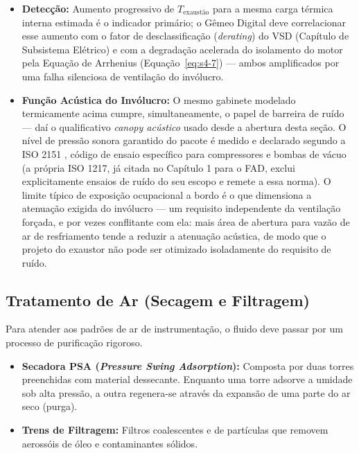 \documentclass[12pt,a4paper]{article}
\numberwithin{equation}{section}
\numberwithin{table}{section}
\numberwithin{figure}{section}
\begin{document}
\begin{itemize}
		\item \textbf{Detecção:} Aumento progressivo de $T_{\text{exaustão}}$ para a mesma carga térmica interna estimada é o indicador primário; o Gêmeo Digital deve correlacionar esse aumento com o fator de desclassificação (\textit{derating}) do VSD (Capítulo de Subsistema Elétrico) e com a degradação acelerada do isolamento do motor pela Equação de Arrhenius (Equação~\eqref{eq:s4-7}) — ambos amplificados por uma falha silenciosa de ventilação do invólucro.
		\item \textbf{Função Acústica do Invólucro:} O mesmo gabinete modelado termicamente acima cumpre, simultaneamente, o papel de barreira de ruído — daí o qualificativo \textit{canopy acústico} usado desde a abertura desta seção. O nível de pressão sonora garantido do pacote é medido e declarado segundo a ISO 2151 \cite{iso2151}, código de ensaio específico para compressores e bombas de vácuo (a própria ISO 1217, já citada no Capítulo 1 para o FAD, exclui explicitamente ensaios de ruído do seu escopo e remete a essa norma). O limite típico de exposição ocupacional a bordo é o que dimensiona a atenuação exigida do invólucro — um requisito independente da ventilação forçada, e por vezes conflitante com ela: mais área de abertura para vazão de ar de resfriamento tende a reduzir a atenuação acústica, de modo que o projeto do exaustor não pode ser otimizado isoladamente do requisito de ruído.
	\end{itemize}

	\subsection{\textbf{Tratamento de Ar (Secagem e Filtragem)}}
	Para atender aos padrões de ar de instrumentação, o fluido deve passar por um processo de purificação rigoroso.
	\begin{itemize}
		\item \textbf{Secadora PSA (\textit{Pressure Swing Adsorption}):} Composta por duas torres preenchidas com material dessecante. Enquanto uma torre adsorve a umidade sob alta pressão, a outra regenera-se através da expansão de uma parte do ar seco (purga).
		\item \textbf{Trens de Filtragem:} Filtros coalescentes e de partículas que removem aerossóis de óleo e contaminantes sólidos.
	\end{itemize}
	
\end{document}
